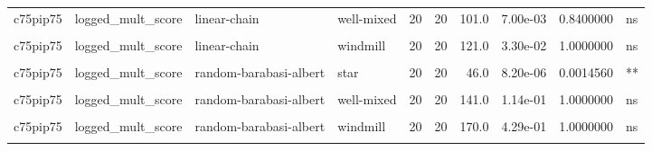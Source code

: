 \documentclass[
]{book}
\begin{document}
\begin{table}
\begin{tabular}{l|l|l|l|r|r|r|r|r|l}
\hline
\cellcolor{gray!6}{c75pip75} & \cellcolor{gray!6}{logged\_mult\_score} & \cellcolor{gray!6}{linear-chain} & \cellcolor{gray!6}{toroidal-lattice} & \cellcolor{gray!6}{20} & \cellcolor{gray!6}{20} & \cellcolor{gray!6}{165.0} & \cellcolor{gray!6}{3.55e-01} & \cellcolor{gray!6}{1.0000000} & \cellcolor{gray!6}{ns}\\
\hline
c75pip75 & logged\_mult\_score & linear-chain & well-mixed & 20 & 20 & 101.0 & 7.00e-03 & 0.8400000 & ns\\
\hline
\cellcolor{gray!6}{c75pip75} & \cellcolor{gray!6}{logged\_mult\_score} & \cellcolor{gray!6}{linear-chain} & \cellcolor{gray!6}{wheel} & \cellcolor{gray!6}{20} & \cellcolor{gray!6}{20} & \cellcolor{gray!6}{60.0} & \cellcolor{gray!6}{6.91e-05} & \cellcolor{gray!6}{0.0109869} & \cellcolor{gray!6}{*}\\
\hline
c75pip75 & logged\_mult\_score & linear-chain & windmill & 20 & 20 & 121.0 & 3.30e-02 & 1.0000000 & ns\\
\hline
\cellcolor{gray!6}{c75pip75} & \cellcolor{gray!6}{logged\_mult\_score} & \cellcolor{gray!6}{random-barabasi-albert} & \cellcolor{gray!6}{random-waxman} & \cellcolor{gray!6}{20} & \cellcolor{gray!6}{20} & \cellcolor{gray!6}{191.0} & \cellcolor{gray!6}{8.20e-01} & \cellcolor{gray!6}{1.0000000} & \cellcolor{gray!6}{ns}\\
\hline
c75pip75 & logged\_mult\_score & random-barabasi-albert & star & 20 & 20 & 46.0 & 8.20e-06 & 0.0014560 & **\\
\hline
\cellcolor{gray!6}{c75pip75} & \cellcolor{gray!6}{logged\_mult\_score} & \cellcolor{gray!6}{random-barabasi-albert} & \cellcolor{gray!6}{toroidal-lattice} & \cellcolor{gray!6}{20} & \cellcolor{gray!6}{20} & \cellcolor{gray!6}{210.0} & \cellcolor{gray!6}{7.99e-01} & \cellcolor{gray!6}{1.0000000} & \cellcolor{gray!6}{ns}\\
\hline
c75pip75 & logged\_mult\_score & random-barabasi-albert & well-mixed & 20 & 20 & 141.0 & 1.14e-01 & 1.0000000 & ns\\
\hline
\cellcolor{gray!6}{c75pip75} & \cellcolor{gray!6}{logged\_mult\_score} & \cellcolor{gray!6}{random-barabasi-albert} & \cellcolor{gray!6}{wheel} & \cellcolor{gray!6}{20} & \cellcolor{gray!6}{20} & \cellcolor{gray!6}{126.0} & \cellcolor{gray!6}{4.60e-02} & \cellcolor{gray!6}{1.0000000} & \cellcolor{gray!6}{ns}\\
\hline
c75pip75 & logged\_mult\_score & random-barabasi-albert & windmill & 20 & 20 & 170.0 & 4.29e-01 & 1.0000000 & ns\\
\hline
\cellcolor{gray!6}{c75pip75} & \cellcolor{gray!6}{logged\_mult\_score} & \cellcolor{gray!6}{random-waxman} & \cellcolor{gray!6}{star} & \cellcolor{gray!6}{20} & \cellcolor{gray!6}{20} & \cellcolor{gray!6}{32.0} & \cellcolor{gray!6}{6.00e-07} & \cellcolor{gray!6}{0.0001329} & \cellcolor{gray!6}{***}\\

\end{tabular}
\end{table}
\end{document}
